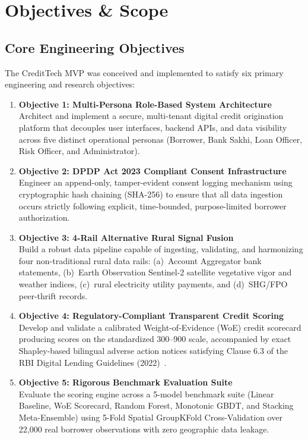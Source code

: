 \documentclass[11pt,a4paper,oneside]{report}
\begin{document}
\chapter{Objectives \& Scope}
\label{chap:objectives_scope}

\section{Core Engineering Objectives}
The CreditTech MVP was conceived and implemented to satisfy six primary engineering and research objectives:

\begin{enumerate}
  \item \textbf{Objective 1: Multi-Persona Role-Based System Architecture}\\
  Architect and implement a secure, multi-tenant digital credit origination platform that decouples user interfaces, backend APIs, and data visibility across five distinct operational personas (Borrower, Bank Sakhi, Loan Officer, Risk Officer, and Administrator).
  
  \item \textbf{Objective 2: DPDP Act 2023 Compliant Consent Infrastructure}\\
  Engineer an append-only, tamper-evident consent logging mechanism using cryptographic hash chaining (SHA-256) to ensure that all data ingestion occurs strictly following explicit, time-bounded, purpose-limited borrower authorization.

  \item \textbf{Objective 3: 4-Rail Alternative Rural Signal Fusion}\\
  Build a robust data pipeline capable of ingesting, validating, and harmonizing four non-traditional rural data rails: (a)~Account Aggregator bank statements, (b)~Earth Observation Sentinel-2 satellite vegetative vigor and weather indices, (c)~rural electricity utility payments, and (d)~SHG/FPO peer-thrift records.

  \item \textbf{Objective 4: Regulatory-Compliant Transparent Credit Scoring}\\
  Develop and validate a calibrated Weight-of-Evidence (WoE) credit scorecard producing scores on the standardized 300--900 scale, accompanied by exact Shapley-based bilingual adverse action notices satisfying Clause 6.3 of the RBI Digital Lending Guidelines (2022)~\cite{rbi_dlg_2022}.

  \item \textbf{Objective 5: Rigorous Benchmark Evaluation Suite}\\
  Evaluate the scoring engine across a 5-model benchmark suite (Linear Baseline, WoE Scorecard, Random Forest, Monotonic GBDT, and Stacking Meta-Ensemble) using 5-Fold Spatial GroupKFold Cross-Validation over 22,000 real borrower observations with zero geographic data leakage.


\end{enumerate}
\end{document}
